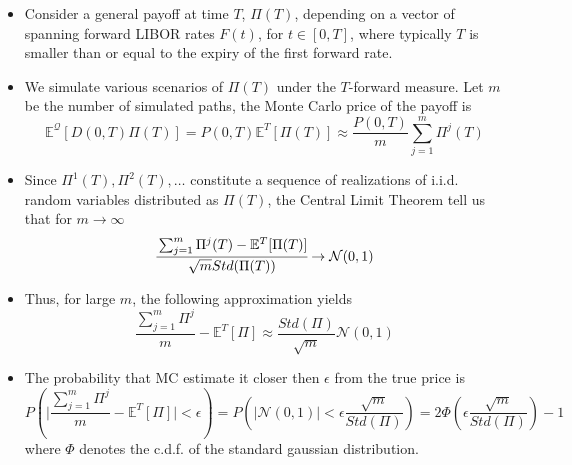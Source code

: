 \documentclass{beamer}
\begin{document}
\begin{frame}
  \begin{itemize}
  \item Consider a general payoff at time $T$, $\Pi(T)$, depending on a vector of spanning forward LIBOR rates $F(t)$, for $t \in [0, T]$, where typically $T$ is smaller than or equal to the expiry of the first forward rate.
  \item We simulate various scenarios of $\Pi(T)$ under the $T$-forward measure. Let $m$ be the number of simulated paths, the Monte Carlo price of the payoff is
    \begin{equation*}
      \mathbb{E}^\mathcal{Q}[D(0,T)\Pi(T)] = P(0,T)\mathbb{E}^T[\Pi(T)]\approx \frac{P(0,T)}{m}\sum_{j=1}^{m}\Pi^j(T)
    \end{equation*}
  \item Since $\Pi^1(T), \Pi^2(T),\ldots$ constitute a sequence of realizations of i.i.d. random variables distributed as $\Pi(T)$, the Central Limit Theorem tell us that for $m\rightarrow\infty$
    \begin{equation*}
      \cfrac{\sum_{j=1}^{m}\Pi^j(T)-\mathbb{E}^T[\Pi(T)]}{\sqrt{m} Std(\Pi(T))}\rightarrow \mathcal{N}(0,1)
    \end{equation*}
  \end{itemize}
\end{frame}

\begin{frame}
  \begin{itemize}
  \item Thus, for large $m$, the following approximation yields
    \begin{equation*}
      \frac{\sum_{j=1}^{m}\Pi^j}{m}-\mathbb{E}^T[\Pi]\approx \frac{Std(\Pi)}{\sqrt{m}}\mathcal{N}(0,1)
    \end{equation*}
  \item The probability that MC estimate it closer then $\epsilon$ from the true price is
    \begin{equation*}
      P\left(\big|\frac{\sum_{j=1}^m\Pi^j}{m}-\mathbb{E}^T[\Pi]\big|<\epsilon\right) = P\left(|\mathcal{N}(0,1)|<\epsilon\frac{\sqrt{m}}{Std(\Pi)}\right) =
      2\Phi\left(\epsilon\frac{\sqrt{m}}{Std(\Pi)}\right)-1
    \end{equation*}
    where $\Phi$ denotes the c.d.f. of the standard gaussian distribution.
  \end{itemize}
\end{frame}
\end{document}
